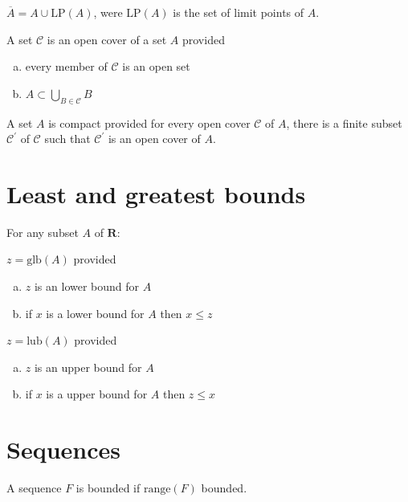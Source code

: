 \documentclass[letterpaper,landscape,9pt,fleqn]{extarticle}
\newcommand{\range}{\mathrm{range}}
\newcommand{\reals}{\mathbf{R}}
\newcommand{\glb}{\mathrm{glb}}
\newcommand{\lub}{\mathrm{lub}}
\newenvironment{alphalist}{
  \begin{enumerate}[(a)]
    \addtolength{\itemsep}{-1.0\itemsep}}
  {\end{enumerate}}
\begin{document}
\begin{multicols*}{3}
\begin{description}[\itemsep=0em]
    \item[Set closure] $\overline{A} = A \cup \mathrm{LP}(A)$, were $\mathrm{LP}(A)$ is the
    set of limit points of $A$.
    
    \item[Open cover] A set $\mathcal{C}$ is an open cover of a set $A$ provided 
     \begin{alphalist}
         \item every member of $\mathcal{C}$ is an open set
         \item $A \subset \underset{B \in \mathcal{C}}{\bigcup} B $
     \end{alphalist}

     \item[Compact] A set $A$ is compact provided for every 
     open cover $\mathcal{C}$ of $A$, there is a finite
     subset $\mathcal{C}^\prime$ of $\mathcal{C}$ such that
     $\mathcal{C}^\prime$ is an open cover of $A$.
     
    \end{description} 

\section*{Least and greatest bounds} 
For any subset $A$ of $\reals$:
\begin{description}[\itemsep=0em]
    \item[glb] $z = \glb(A)$ provided
    \begin{alphalist}
        \item $z$ is an lower bound for $A$
        \item if $x$ is a lower bound for $A$ then $x \leq z$
    \end{alphalist}
   \item[lub]  $z = \lub(A)$ provided
   \begin{alphalist}
       \item $z$ is an upper bound for $A$
       \item if $x$ is a upper bound for $A$ then $z \leq x$
   \end{alphalist}
\end{description}   
\section*{Sequences}
\begin{description}[\itemsep=0em]
\item[Bounded] A sequence $F$ is bounded if $\range(F)$ bounded.


\end{description}
\end{multicols*}
\end{document}
